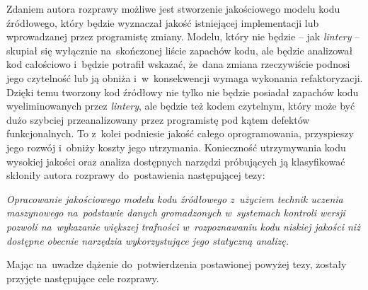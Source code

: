 \documentclass[twoside]{praca}
\begin{document}

Zdaniem autora rozprawy możliwe jest stworzenie jakościowego modelu kodu źródłowego, który będzie wyznaczał jakość istniejącej implementacji lub wprowadzanej przez programistę zmiany. Modelu, który nie będzie -- jak \textit{lintery} -- skupiał się wyłącznie na~skończonej liście zapachów kodu, ale będzie analizował kod całościowo i~będzie potrafił wskazać, że~dana zmiana rzeczywiście podnosi jego czytelność lub ją obniża i~w~konsekwencji wymaga wykonania refaktoryzacji. Dzięki temu tworzony kod źródłowy nie tylko nie będzie posiadał zapachów kodu wyeliminowanych przez \textit{lintery}, ale będzie też kodem czytelnym, który może być dużo szybciej przeanalizowany przez programistę pod kątem defektów funkcjonalnych. To z~kolei podniesie jakość całego oprogramowania, przyspieszy jego rozwój i~obniży koszty jego utrzymania. Konieczność utrzymywania kodu wysokiej jakości oraz analiza dostępnych narzędzi próbujących ją klasyfikować skłoniły autora rozprawy do~postawienia następującej tezy:

\vspace{5mm}
\begin{addmargin}{1cm}
\textit{Opracowanie jakościowego modelu kodu źródłowego z~użyciem technik uczenia maszynowego na~podstawie danych gromadzonych w~systemach kontroli wersji pozwoli na~wykazanie większej trafności w~rozpoznawaniu kodu niskiej jakości niż dostępne obecnie narzędzia wykorzystujące jego statyczną analizę.}
\end{addmargin}


Mając na~uwadze dążenie do~potwierdzenia postawionej powyżej tezy, zostały przyjęte następujące cele rozprawy.

\end{document}
